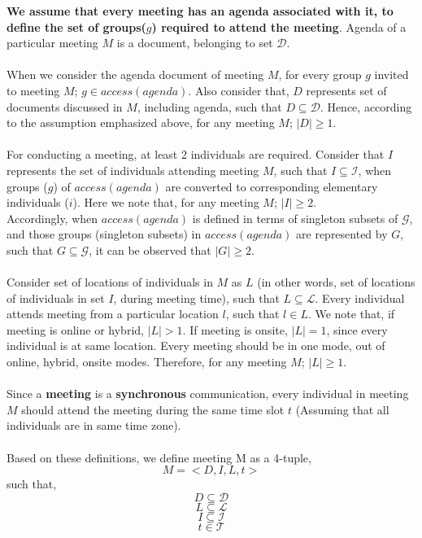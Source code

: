 \documentclass{article}
\begin{document}
\noindent
\textbf{We assume that every meeting has an agenda associated with it, to define the set of groups($g$) required to attend the meeting}. Agenda of a particular meeting $M$ is a document, belonging to set $\mathcal{D}$.\\ \\
When we consider the agenda document of meeting $M$, for every group $g$ invited to meeting $M$; $g \in access(agenda)$. Also consider that, $D$ represents set of documents discussed in $M$, including agenda, such that $D \subseteq \mathcal{D}$. Hence, according to the assumption emphasized above, for any meeting $M$; $|D| \geq 1$.\\ \\ 
For conducting a meeting, at least 2 individuals are required. Consider that $I$ represents the set of individuals attending meeting $M$, such that $I \subseteq \mathcal{I}$, when groups ($g$) of $access(agenda)$ are converted to corresponding elementary individuals ($i$). Here we note that, for any meeting $M$; $|I| \geq 2$.\\
Accordingly, when $access(agenda)$ is defined in terms of singleton subsets of $\mathcal{G}$, and those groups (singleton subsets) in $access(agenda)$ are represented by $G$, such that $G \subseteq \mathcal{G}$, it can be observed that $|G| \geq 2$. \\ \\  
Consider set of locations of individuals in $M$ as $L$ (in other words, set of locations of individuals in set $I$, during meeting time), such that $L \subseteq \mathcal{L}$. Every individual attends meeting from a particular location $l$, such that $l \in L$. We note that, if meeting is online or hybrid, $|L| > 1$. If meeting is onsite, $|L| = 1$, since every individual is at same location. Every meeting should be in one mode, out of online, hybrid, onsite modes. Therefore, for any meeting $M$; $|L| \geq 1$. \\ \\
Since a \textbf{meeting} is a \textbf{synchronous} communication, every individual in meeting $M$ should attend the meeting during the same time slot $t$ (Assuming that all individuals are in same time zone).  \\ \\
Based on these definitions, we define meeting M as a 4-tuple,
    \[ M = < D, I, L, t > \]
such that,
    \[ D \subseteq \mathcal{D} \]
    \[ L \subseteq \mathcal{L} \]
    \[ I \subseteq \mathcal{I} \]
    \[ t \in \mathcal{T} \]
\end{document}
